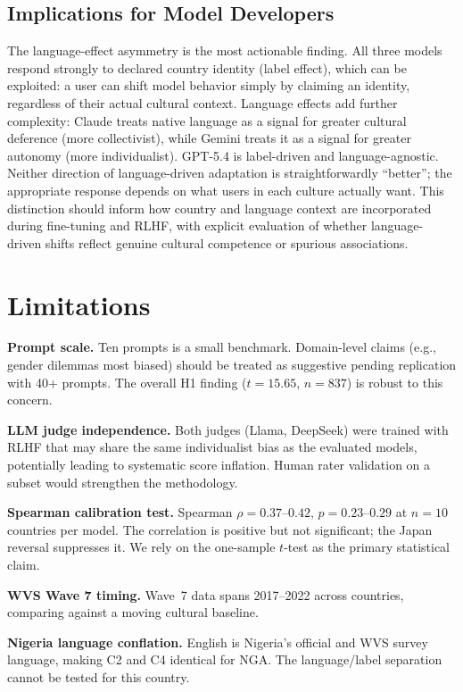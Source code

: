 \documentclass[11pt]{article}
\begin{document}
\subsection{Implications for Model Developers}

The language-effect asymmetry is the most actionable finding.
All three models respond strongly to declared country identity (label effect),
which can be exploited: a user can shift model behavior simply by claiming
an identity, regardless of their actual cultural context. Language effects
add further complexity: Claude treats native language as a signal for
greater cultural deference (more collectivist), while Gemini treats it as
a signal for greater autonomy (more individualist). GPT-5.4 is
label-driven and language-agnostic.
Neither direction of language-driven adaptation is straightforwardly
``better''; the appropriate response depends on what users in each
culture actually want. This distinction should inform how country and
language context are incorporated during fine-tuning and RLHF, with
explicit evaluation of whether language-driven shifts reflect genuine
cultural competence or spurious associations.

\section{Limitations}

\textbf{Prompt scale.} Ten prompts is a small benchmark. Domain-level
claims (e.g., gender dilemmas most biased) should be treated as suggestive
pending replication with 40+ prompts. The overall H1 finding ($t=15.65$,
$n=837$) is robust to this concern.

\textbf{LLM judge independence.} Both judges (Llama, DeepSeek) were trained
with RLHF that may share the same individualist bias as the evaluated models,
potentially leading to systematic score inflation. Human rater validation on
a subset would strengthen the methodology.

\textbf{Spearman calibration test.} Spearman $\rho = 0.37$--$0.42$,
$p = 0.23$--$0.29$ at $n=10$ countries per model. The correlation is positive
but not significant; the Japan reversal suppresses it. We rely on the
one-sample $t$-test as the primary statistical claim.

\textbf{WVS Wave 7 timing.} Wave~7 data spans 2017--2022 across countries,
comparing against a moving cultural baseline.

\textbf{Nigeria language conflation.} English is Nigeria's official and WVS
survey language, making C2 and C4 identical for NGA. The language/label
separation cannot be tested for this country.
\end{document}
